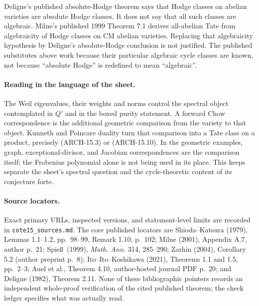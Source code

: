 Deligne's published absolute-Hodge theorem says that Hodge classes on
abelian varieties are absolute Hodge classes. It does not say that all
such classes are algebraic. Milne's published 1999 Theorem 7.1 derives
all-abelian Tate from algebraicity of Hodge classes on CM abelian
varieties. Replacing that algebraicity hypothesis by Deligne's
absolute-Hodge conclusion is not justified. The published substitutes
above work because their particular algebraic cycle classes are known,
not because ``absolute Hodge'' is redefined to mean ``algebraic''.

\paragraph{Reading in the language of the sheet.}
The Weil eigenvalues, their weights and norms control the spectral
object contemplated in \(Q'\) and in the boxed purity statement. A
forward Chow correspondence is the additional geometric comparison
from the variety to that object. Kunneth and Poincare duality turn that
comparison into a Tate class on a product, precisely (ARCH-15.3) or
(ARCH-15.10). In the geometric examples, graph, exceptional-divisor,
and Jacobian correspondences are the comparison itself; the Frobenius
polynomial alone is not being used in its place. This keeps separate
the sheet's spectral question and the cycle-theoretic content of its
conjecture forte.

\paragraph{Source locators.}
Exact primary URLs, inspected versions, and statement-level limits are
recorded in \texttt{cote15\_sources.md}. The core published locators are
Shioda--Katsura (1979), Lemmas 1.1--1.2, pp.~98--99, Remark 1.10,
p.~102; Milne (2001), Appendix A.7, author p.~21; Spie\ss\ (1999),
\emph{Math. Ann.} 314, 285--290; Zarhin (2004), Corollary 5.2 (author
preprint p.~8); Ito--Ito--Koshikawa (2021), Theorems 1.1 and 1.5,
pp.~2--3; Auel et al., Theorem 4.10, author-hosted journal PDF p.~20;
and Deligne (1982), Theorem 2.11. None of these bibliographic pointers
records an independent whole-proof verification of the cited published
theorem; the check ledger specifies what was actually read.
